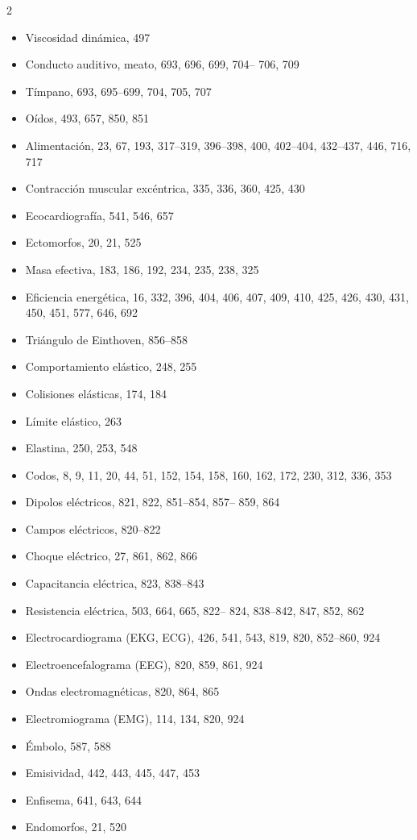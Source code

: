 \documentclass[12pt,a4paper]{book}
\begin{document}
\begin{multicols}{2}
\begin{itemize}[leftmargin=*]
  \item Viscosidad dinámica, 497
  \item Conducto auditivo, meato, 693, 696, 699, 704-- 706, 709
  \item Tímpano, 693, 695--699, 704, 705, 707
  \item Oídos, 493, 657, 850, 851
  \item Alimentación, 23, 67, 193, 317--319, 396--398, 400, 402--404, 432--437, 446, 716, 717
  \item Contracción muscular excéntrica, 335, 336, 360, 425, 430
  \item Ecocardiografía, 541, 546, 657
  \item Ectomorfos, 20, 21, 525
  \item Masa efectiva, 183, 186, 192, 234, 235, 238, 325
  \item Eficiencia energética, 16, 332, 396, 404, 406, 407, 409, 410, 425, 426, 430, 431, 450, 451, 577, 646, 692
  \item Triángulo de Einthoven, 856--858
  \item Comportamiento elástico, 248, 255
  \item Colisiones elásticas, 174, 184
  \item Límite elástico, 263
  \item Elastina, 250, 253, 548
  \item Codos, 8, 9, 11, 20, 44, 51, 152, 154, 158, 160, 162, 172, 230, 312, 336, 353
  \item Dipolos eléctricos, 821, 822, 851--854, 857-- 859, 864
  \item Campos eléctricos, 820--822
  \item Choque eléctrico, 27, 861, 862, 866
  \item Capacitancia eléctrica, 823, 838--843
  \item Resistencia eléctrica, 503, 664, 665, 822-- 824, 838--842, 847, 852, 862
  \item Electrocardiograma (EKG, ECG), 426, 541, 543, 819, 820, 852--860, 924
  \item Electroencefalograma (EEG), 820, 859, 861, 924
  \item Ondas electromagnéticas, 820, 864, 865
  \item Electromiograma (EMG), 114, 134, 820, 924
  \item Émbolo, 587, 588
  \item Emisividad, 442, 443, 445, 447, 453
  \item Enfisema, 641, 643, 644
  \item Endomorfos, 21, 520

\end{itemize}
\end{multicols}
\end{document}
